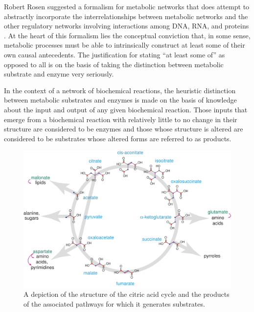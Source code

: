 Robert Rosen suggested a formalism for metabolic networks that does attempt to abstractly incorporate the interrelationships between metabolic networks and the other regulatory networks involving interactions among DNA, RNA, and proteins \cite{Rosen1972,Rosen1991}. At the heart of this formalism lies the conceptual conviction that, in some sense, metabolic processes must be able to intrinsically construct at least some of their own causal antecedents. The justification for stating ``at least some of'' as opposed to all is on the basis of taking the distinction between metabolic substrate and enzyme very seriously.

In the context of a network of biochemical reactions, the heuristic distinction between metabolic substrates and enzymes is made on the basis of knowledge about the input and output of any given biochemical reaction. Those inputs that emerge from a biochemical reaction with relatively little to no change in their structure are considered to be enzymes and those whose structure is altered are considered to be substrates whose altered forms are referred to as products.

\begin{figure}
\begin{center}
\noindent\includegraphics[width=0.7\columnwidth]{fig/rTCA_skeleton.pdf}
\end{center}
\caption{A depiction of the structure of the citric acid cycle and the products of the associated pathways for which it generates substrates.}
\label{fig:ctacyc}
\end{figure}

